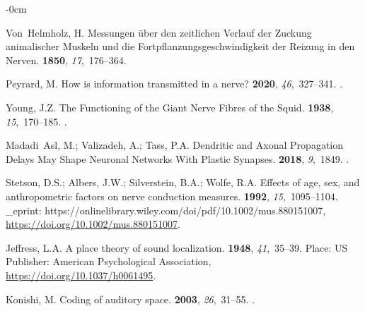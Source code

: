 \documentclass[brainsci, %
               review,submit,pdftex,moreauthors
               ]{Definitions/mdpi}
\begin{document}
\begin{adjustwidth}{-\extralength}{0cm}
\begin{thebibliography}{999}
  Von~Helmholz, H.
  \newblock Messungen über den zeitlichen {Verlauf} der {Zuckung} animalischer
    {Muskeln} und die {Fortpflanzungsgeschwindigkeit} der {Reizung} in den
    {Nerven}.
    {\bf 1850}, {\em 17},~176--364.
  
  Peyrard, M.
  \newblock How is information transmitted in a nerve?
   {\bf 2020}, {\em 46},~327--341.
  .
  
  Young, J.Z.
  \newblock The {Functioning} of the {Giant} {Nerve} {Fibres} of the {Squid}.
   {\bf 1938}, {\em 15},~170--185.
  .
  
  Madadi~Asl, M.; Valizadeh, A.; Tass, P.A.
  \newblock Dendritic and {Axonal} {Propagation} {Delays} {May} {Shape}
    {Neuronal} {Networks} {With} {Plastic} {Synapses}.
   {\bf 2018}, {\em 9},~1849.
  .
  
  Stetson, D.S.; Albers, J.W.; Silverstein, B.A.; Wolfe, R.A.
  \newblock Effects of age, sex, and anthropometric factors on nerve conduction
    measures.
   {\bf 1992}, {\em 15},~1095--1104.
  \newblock \_eprint:
    https://onlinelibrary.wiley.com/doi/pdf/10.1002/mus.880151007,
    {\url{https://doi.org/10.1002/mus.880151007}}.
  
  Jeffress, L.A.
  \newblock A place theory of sound localization.
   {\bf 1948},
    {\em 41},~35--39.
  \newblock Place: US Publisher: American Psychological Association,
    {\url{https://doi.org/10.1037/h0061495}}.
  
  Konishi, M.
  \newblock Coding of auditory space.
   {\bf 2003}, {\em 26},~31--55.
  .
  

\end{thebibliography}
\end{adjustwidth}
\end{document}
